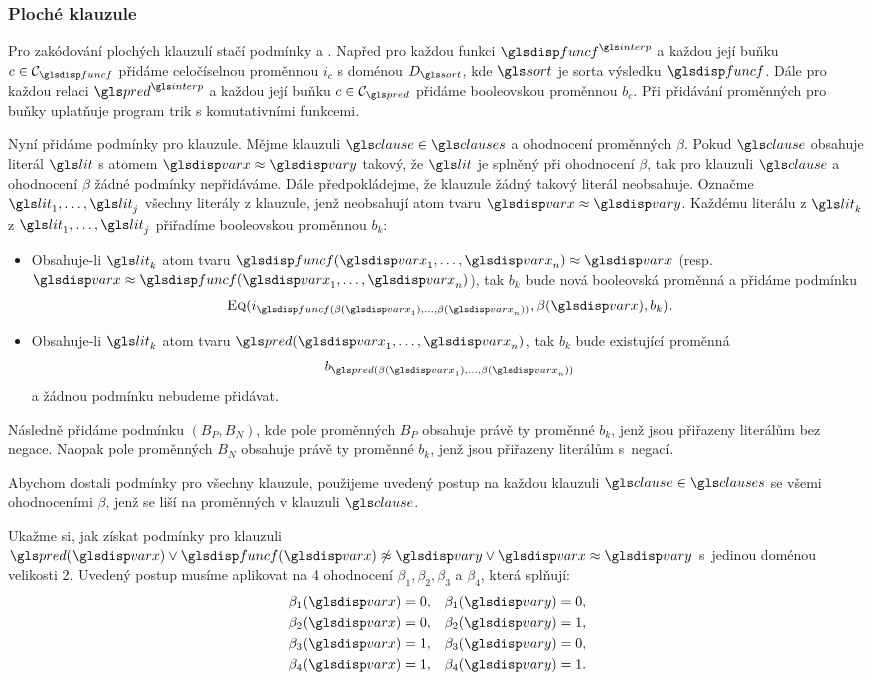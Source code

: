 {\subsubsection{Ploché klauzule}

Pro zakódování plochých klauzulí stačí podmínky \Eq{} a \Clause{}.
Napřed pro každou funkci $\func^\interp$ a každou její buňku
$c \in \cells_\func$ přidáme celočíselnou proměnnou $i_c$
s doménou $D_\sort$, kde $\sort$ je sorta výsledku $\func$.
Dále pro každou relaci $\pred^\interp$ a každou její buňku
$c \in \cells_\pred$ přidáme booleovskou proměnnou $b_c$.
Při přidávání proměnných pro buňky uplatňuje program \crossbow{}
trik s komutativními funkcemi.

Nyní přidáme podmínky pro klauzule. Mějme klauzuli
$\clause \in \clauses$ a ohodnocení proměnných $\beta$.
Pokud $\clause$ obsahuje literál $\lit$ s atomem $\var \approx \varY$
takový, že $\lit$ je splněný při ohodnocení $\beta$, tak
pro klauzuli $\clause$ a ohodnocení $\beta$ žádné podmínky nepřidáváme.
Dále předpokládejme, že klauzule žádný takový literál neobsahuje.
Označme $\lit_1 \comdots \lit_j$ všechny literály z klauzule,
jenž neobsahují atom tvaru $\var \approx \varY$.
Každému literálu z $\lit_k$ z $\lit_1 \comdots \lit_j$
přiřadíme booleovskou proměnnou $b_k$:
\begin{itemize}
\item Obsahuje-li $\lit_k$ atom tvaru
  $\func(\var_1 \comdots \var_n) \approx \var$ (resp.
  $\var \approx \func(\var_1 \comdots \var_n)$),
  tak $b_k$ bude nová booleovská proměnná
  a přidáme podmínku
  \[
    \Eq(i_{\func(\beta(\var_1) \comdots \beta(\var_n))}, \beta(\var), b_k).
  \]
\item Obsahuje-li $\lit_k$ atom tvaru
  $\pred(\var_1 \comdots \var_n)$, tak $b_k$ bude existující proměnná
  \[
    b_{\pred(\beta(\var_1) \comdots \beta(\var_n))}
  \]
  a žádnou podmínku nebudeme přidávat.
\end{itemize}
Následně přidáme podmínku \Clause$(B_P, B_N)$, kde pole
proměnných $B_P$ obsahuje právě ty proměnné
$b_k$, jenž jsou přiřazeny literálům bez negace.
Naopak pole proměnných $B_N$ obsahuje právě ty proměnné $b_k$,
jenž jsou přiřazeny literálům s~negací.

Abychom dostali podmínky pro všechny klauzule,
použijeme uvedený postup na každou klauzuli $\clause \in \clauses$
se všemi ohodnoceními $\beta$, jenž se liší na proměnných
v klauzuli $\clause$.

Ukažme si, jak získat podmínky pro klauzuli
$\pred(\var) \vee \func(\var) \not\approx \varY \vee \var \approx \varY$
s~jedinou doménou velikosti 2. Uvedený postup musíme
aplikovat na 4 ohodnocení $\beta_1, \beta_2, \beta_3$ a $\beta_4$,
která splňují:
\begin{align*}
\beta_1(\var) &= 0, & \beta_1(\varY) &= 0, \\
\beta_2(\var) &= 0, & \beta_2(\varY) &= 1, \\
\beta_3(\var) &= 1, & \beta_3(\varY) &= 0, \\
\beta_4(\var) &= 1, & \beta_4(\varY) &= 1.
\end{align*}

}
